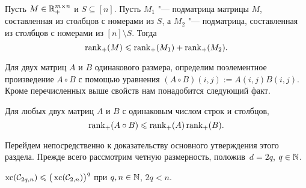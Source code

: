 \begin{property}\label{prop:nonnegsum}
Пусть $M \in \mathbb{R}_+^{m\times n}$ и $S\subseteq[n]$. Пусть $M_1$ "--- подматрица матрицы $M$, составленная из столбцов с номерами из $S$, а $M_2$ "--- подматрица, составленная из столбцов с номерами из $[n]\setminus S$.
Тогда
\[
\operatorname{rank}_+(M) \leqslant \operatorname{rank}_+(M_1) + \operatorname{rank}_+(M_2).
\]
\end{property}

Для двух матриц $A$ и $B$ одинакового размера, определим поэлементное произведение $A \circ B$ с помощью уравнения $(A \circ B)(i,j):=A(i,j) B(i,j)$. Кроме перечисленных выше свойств нам понадобится следующий факт.

\begin{lemma} \label{lem:Kronecker}
Для любых двух матриц $A$ и $B$ с одинаковым числом строк и столбцов,
\[
\operatorname{rank}_+(A \circ B) \leqslant \operatorname{rank}_+(A) \operatorname{rank}_+(B).
\]
\end{lemma}
%

Перейдем непосредственно к доказательству основного утверждения этого раздела.
Прежде всего рассмотрим четную размерность, положив~$d = 2q$, $q\in \mathbb{N}$.

\begin{lemma}
\label{lem:even_case}
$\operatorname{xc}({\mathcal C}_{2q, n}) \leqslant \big(\operatorname{xc}({\mathcal C}_{2, n})\big)^q$ при $q,n\in\mathbb{N}$, $2q < n$.
\end{lemma}

